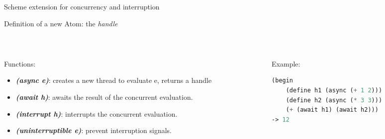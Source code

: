 \begin{frame}[fragile]{Scheme extension for concurrency and interruption}

    Definition of a new Atom: the \emph{handle}
    
    ~~
\pause
    \begin{columns}
        \begin{column}{0.6\textwidth}
            Functions:
            \begin{itemize}
                \item \textbf{\textit{(async e)}}: creates a new thread to evaluate e, returns a handle
                \item \textbf{\textit{(await h)}}: awaits the result of the concurrent evaluation.
                \item \textbf{\textit{(interrupt h)}}: interrupts the concurrent evaluation.
                \item \textbf{\textit{(uninterruptible e)}}: prevent interruption signals.
            \end{itemize}
        \end{column}
        \pause
        \begin{column}{0.4\textwidth}
        Example: 
\small
\lstset{columns=fullflexible}
            \begin{lstlisting}[language = lisp]
(begin
    (define h1 (async (+ 1 2)))
    (define h2 (async (* 3 3)))
    (+ (await h1) (await h2)))
-> 12 
            \end{lstlisting}
        \end{column}
    \end{columns}
\end{frame}

